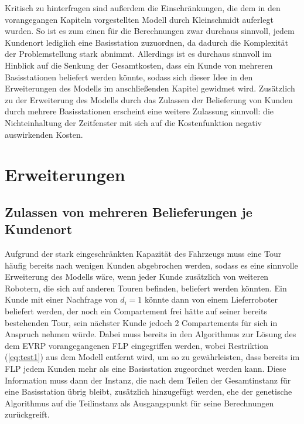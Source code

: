 \documentclass[a4paper,12pt,parskip,bibtotoc,liststotoc]{article}
\begin{document}
Kritisch zu hinterfragen sind außerdem die Einschränkungen, die dem in den vorangegangen Kapiteln vorgestellten Modell durch Kleinschmidt auferlegt wurden. 
So ist es zum einen für die Berechnungen zwar durchaus sinnvoll, jedem Kundenort lediglich eine Basisstation zuzuordnen, da dadurch die Komplexität der Problemstellung stark abnimmt. 
Allerdings ist es durchaus sinnvoll im Hinblick auf die Senkung der Gesamtkosten, dass ein Kunde von mehreren Basisstationen beliefert werden könnte, sodass sich dieser Idee in den Erweiterungen des Modells im anschließenden Kapitel gewidmet wird.
Zusätzlich zu der Erweiterung des Modells durch das Zulassen der Belieferung von Kunden durch mehrere Basisstationen erscheint eine weitere Zulassung sinnvoll: die Nichteinhaltung der Zeitfenster mit sich auf die Kostenfunktion negativ auswirkenden Kosten.


\newpage

\section{Erweiterungen}

\subsection{Zulassen von mehreren Belieferungen je Kundenort}

Aufgrund der stark eingeschränkten Kapazität des Fahrzeugs muss eine Tour häufig bereits nach wenigen Kunden abgebrochen werden, sodass es eine sinnvolle Erweiterung des Modells wäre, wenn jeder Kunde zusätzlich von weiteren Robotern, die sich auf anderen Touren befinden, beliefert werden könnten.
Ein Kunde mit einer Nachfrage von $d_{i} = 1$ könnte dann von einem Lieferroboter beliefert werden, der noch ein Compartement frei hätte auf seiner bereits bestehenden Tour, sein nächster Kunde jedoch 2 Compartements für sich in Anspruch nehmen würde.
Dabei muss bereits in den Algorithmus zur Lösung des dem EVRP vorangegangenen  FLP eingegriffen werden, wobei Restriktion (\ref{eq:test1}) aus dem Modell entfernt wird, um so zu gewährleisten, dass bereits im FLP jedem Kunden mehr als eine Basisstation zugeordnet werden kann.
Diese Information muss dann der Instanz, die nach dem Teilen der Gesamtinstanz für eine Basisstation übrig bleibt, zusätzlich hinzugefügt werden, ehe der genetische Algorithmus auf die Teilinstanz als Ausgangspunkt für seine Berechnungen zurückgreift.
\end{document}
